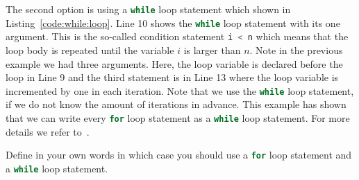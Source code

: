 The second option is using a \lstinline[language=C++]|while| loop statement which shown in Listing~\ref{code:while:loop}. Line 10 shows the \lstinline[language=C++]|while| loop statement with its one argument. This is the so-called condition statement  \lstinline[language=C++]{i < n} which means that the loop body is repeated until the variable $i$ is larger than $n$. Note in the previous example we had three arguments. Here, the loop variable is declared before the loop in Line 9 and the third statement is  in Line 13 where the loop variable is incremented by one in each iteration. Note that we use the \lstinline[language=C++]|while| loop statement, if we do not know the amount of iterations in advance. This example has shown that we can write every \lstinline[language=C++]|for| loop statement as a \lstinline[language=C++]|while| loop statement. For more details we refer to~\cite[Chapter~2]{andrew2000accelerated}.   




\begin{exercise}
Define in your own words in which case you should use a \lstinline[language=C++]|for| loop statement and a \lstinline[language=C++]|while| loop statement. 
\end{exercise}

